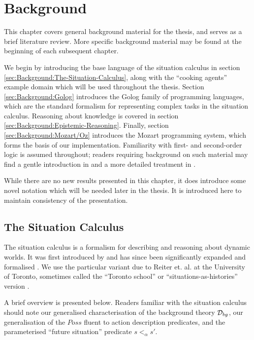 

\chapter{Background}

\label{ch:background}

This chapter covers general background material for the thesis, and
serves as a brief literature review. More specific background material
may be found at the beginning of each subsequent chapter.

We begin by introducing the base language of the situation calculus
in section \ref{sec:Background:The-Situation-Calculus}, along with
the {}``cooking agents'' example domain which will be used throughout
the thesis. Section \ref{sec:Background:Golog} introduces the Golog
family of programming languages, which are the standard formalism
for representing complex tasks in the situation calculus. Reasoning
about knowledge is covered in section \ref{sec:Background:Epistemic-Reasoning}.
Finally, section \ref{sec:Background:Mozart/Oz} introduces the Mozart
programming system, which forms the basis of our implementation. Familiarity
with first- and second-order logic is assumed throughout; readers
requiring background on such material may find a gentle introduction
in \citep{kelly96logic} and a more detailed treatment in \citep{fitting96fol_book}.

While there are no new results presented in this chapter, it does
introduce some novel notation which will be needed later in the thesis.
It is introduced here to maintain consistency of the presentation.


\section{The Situation Calculus\label{sec:Background:The-Situation-Calculus}}

The situation calculus is a formalism for describing and reasoning
about dynamic worlds. It was first introduced by \citet{McCHay69sitcalc}
and has since been significantly expanded and formalised \citep{reiter91frameprob,pirri99contributions_sitcalc}.
We use the particular variant due to Reiter et. al. at the University
of Toronto, sometimes called the {}``Toronto school'' or {}``situations-as-histories''
version \citep{levesque98sc_foundations,pirri99contributions_sitcalc}.

A brief overview is presented below. Readers familiar with the situation
calculus should note our generalised characterisation of the background
theory $\mathcal{D}_{bg}$, our generalisation of the $Poss$ fluent to action
description predicates, and the parameterised {}``future situation''
predicate $s<_{\alpha}s'$.


